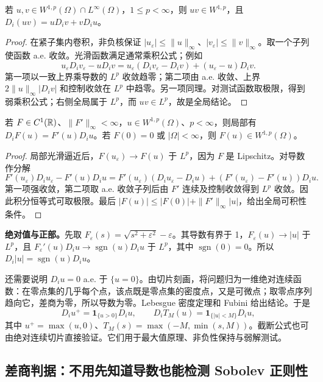 \begin{proposition}\label{prop:weak-product}
若 $u,v\in W^{1,p}(\Omega)\cap L^\infty(\Omega)$，$1\le p<\infty$，则 $uv\in W^{1,p}$，且 $D_i(uv)=uD_iv+vD_iu$。
\end{proposition}
\begin{proof}
在紧子集内卷积，非负核保证 $|u_\varepsilon|\le\|u\|_\infty$、$|v_\varepsilon|\le\|v\|_\infty$。取一个子列使函数 a.e. 收敛。光滑函数满足通常乘积公式；例如
\[
 u_\varepsilon D_iv_\varepsilon-uD_iv
 =u_\varepsilon(D_iv_\varepsilon-D_iv)
   +(u_\varepsilon-u)D_iv.
\]
第一项以一致上界乘导数的 $L^p$ 收敛趋零；第二项由 a.e. 收敛、上界 $2\|u\|_\infty|D_iv|$ 和控制收敛在 $L^p$ 中趋零。另一项同理。对测试函数取极限，得到弱乘积公式；右侧全局属于 $L^p$，而 $uv\in L^p$，故是全局结论。
\end{proof}

\begin{proposition}[有界导数的链式法则]\label{prop:weak-chain}
若 $F\in C^1(\mathbb R)$、$\|F'\|_\infty<\infty$，$u\in W^{1,p}(\Omega)$、$p<\infty$，则局部有 $D_iF(u)=F'(u)D_i u$。若 $F(0)=0$ 或 $|\Omega|<\infty$，则 $F(u)\in W^{1,p}(\Omega)$。
\end{proposition}
\begin{proof}
局部光滑逼近后，$F(u_\varepsilon)\to F(u)$ 于 $L^p$，因为 $F$ 是 Lipschitz。对导数作分解
\[
 F'(u_\varepsilon)D_i u_\varepsilon-F'(u)D_i u
 =F'(u_\varepsilon)(D_i u_\varepsilon-D_i u)
  +(F'(u_\varepsilon)-F'(u))D_i u.
\]
第一项强收敛，第二项取 a.e. 收敛子列后由 $F'$ 连续及控制收敛得到 $L^p$ 收敛。因此积分恒等式可取极限。最后 $|F(u)|\le|F(0)|+\|F'\|_\infty|u|$，给出全局可积性条件。
\end{proof}

\textbf{绝对值与正部。}先取 $F_\varepsilon(s)=\sqrt{s^2+\varepsilon^2}-\varepsilon$。其导数有界于 1，$F_\varepsilon(u)\to|u|$ 于 $L^p$，且 $F_\varepsilon'(u)D_i u\to\operatorname{sgn}(u)D_i u$ 于 $L^p$，其中 $\operatorname{sgn}(0)=0$。所以 $D_i|u|=\operatorname{sgn}(u)D_i u$。

还需要说明 $D_i u=0$ a.e. 于 $\{u=0\}$。由切片刻画，将问题归为一维绝对连续函数：在零点集的几乎每个点，该点既是零点集的密度点，又是可微点；取零点序列趋向它，差商为零，所以导数为零。Lebesgue 密度定理和 Fubini 给出结论。于是
\[
 D_i u^+=\mathbf1_{\{u>0\}}D_i u,\qquad
 D_iT_M(u)=\mathbf1_{\{|u|<M\}}D_i u,
\]
其中 $u^+=\max(u,0)$、$T_M(s)=\max(-M,\min(s,M))$。截断公式也可由绝对连续切片直接验证。它们用于最大值原理、非负性保持与弱解测试。

\subsection{差商判据：不用先知道导数也能检测 Sobolev 正则性}

